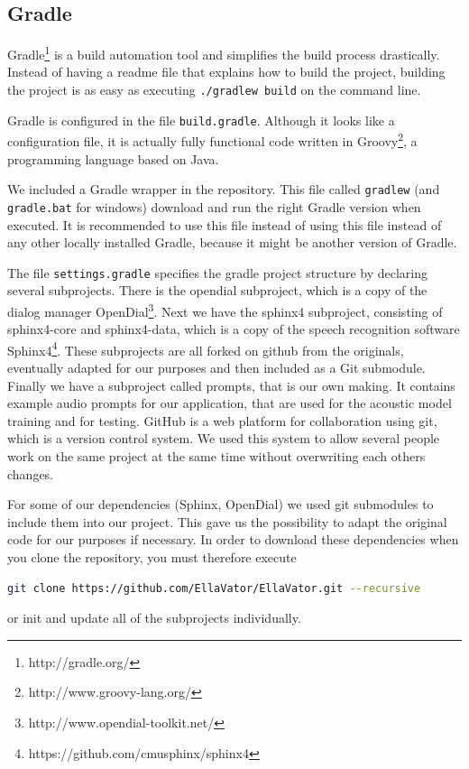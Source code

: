 \documentclass[a4paper, 12pt]{article}
\begin{document}
\subsection{Gradle}
Gradle\footnote{http://gradle.org/} is a build automation tool and simplifies the build process drastically.
Instead of having a readme file that explains how to build the project, building the project is as easy as executing \texttt{./gradlew build} on the command line.

Gradle is configured in the file \texttt{build.gradle}.
Although it looks like a configuration file, it is actually fully functional code written in Groovy\footnote{http://www.groovy-lang.org/}, a programming language based on Java.

We included a Gradle wrapper in the repository.
This file called \texttt{gradlew} (and \texttt{gradle.bat} for windows) download and run the right Gradle version when executed.
It is recommended to use this file instead of using this file instead of any other locally installed Gradle, because it might be another version of Gradle.

The file \texttt{settings.gradle} specifies the gradle project structure by declaring several subprojects.
There is the opendial subproject, which is a copy of the dialog manager OpenDial\footnote{http://www.opendial-toolkit.net/}.
Next we have the sphinx4 subproject, consisting of sphinx4-core and sphinx4-data, which is a copy of the speech recognition software Sphinx4\footnote{https://github.com/cmusphinx/sphinx4}.
These subprojects are all forked on github from the originals, eventually adapted for our purposes and then included as a Git submodule.
Finally we have a subproject called prompts, that is our own making.
It contains example audio prompts for our application, that are used for the acoustic model training and for testing.
GitHub is a web platform for collaboration using git, which is a version control system. 
We used this system to allow several people work on the same project at the same time without overwriting each others changes.

For some of our dependencies (Sphinx, OpenDial) we used git submodules to include them into our project. 
This gave us the possibility to adapt the original code for our purposes if necessary.
In order to download these dependencies when you clone the repository, you must therefore execute
\begin{lstlisting}[language=bash]
git clone https://github.com/EllaVator/EllaVator.git --recursive
\end{lstlisting}
or init and update all of the subprojects individually.
\end{document}
